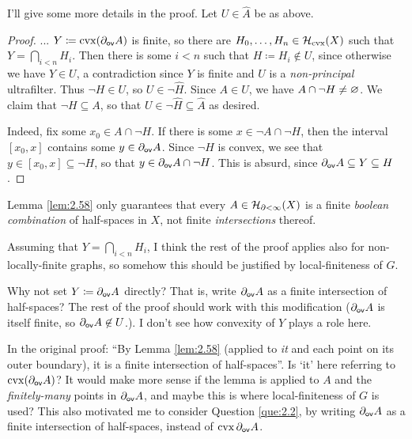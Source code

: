\documentclass{amsart}
\begin{document}
    I'll give some more details in the proof. Let $U\in\widehat{A}$ be as above.

    \begin{proof}
        ... $Y\coloneqq\cvx(\del_\sf{ov}A)$ is finite, so there are $H_0,\dots,H_n\in\mc{H}_\textrm{cvx}(X)$ such that $Y=\bigcap_{i<n}H_i$. Then there is some $i<n$ such that $H\coloneqq H_i\not\in U$, since otherwise we have $Y\in U$, a contradiction since $Y$ is finite and $U$ is a \textit{non-principal} ultrafilter. Thus $\lnot H\in U$, so $U\in\lnot\widehat{H}$. Since $A\in U$, we have $A\cap\lnot H\neq\em$. We claim that $\lnot H\subseteq A$, so that $U\in\lnot\widehat{H}\subseteq\widehat{A}$ as desired.

        Indeed, fix some $x_0\in A\cap\lnot H$. If there is some $x\in\lnot A\cap\lnot H$, then the interval $[x_0,x]$ contains some $y\in\del_\sf{ov}A$. Since $\lnot H$ is convex, we see that $y\in[x_0,x]\subseteq\lnot H$, so that $y\in\del_\sf{ov}A\cap\lnot H$. This is absurd, since $\del_\sf{ov}A\subseteq Y\subseteq H$.
    \end{proof}

    \begin{question}
        Lemma \ref{lem:2.58} only guarantees that every $A\in\mc{H}_{\del<\infty}(X)$ is a finite \textit{boolean combination} of half-spaces in $X$, not finite \textit{intersections} thereof.

        Assuming that $Y=\bigcap_{i<n}H_i$, I think the rest of the proof applies also for non-locally-finite graphs, so somehow this should be justified by local-finiteness of $G$.
    \end{question}

    \begin{question}\label{que:2.2}
        Why not set $Y\coloneqq\del_\sf{ov}A$ directly? That is, write $\del_\sf{ov}A$ as a finite intersection of half-spaces? The rest of the proof should work with this modification ($\del_\sf{ov}A$ is itself finite, so $\del_\sf{ov}A\not\in U$.). I don't see how convexity of $Y$ plays a role here.
    \end{question}

    \begin{question}
        In the original proof: ``By Lemma \ref{lem:2.58} (applied to \textit{it} and each point on its outer boundary), it is a finite intersection of half-spaces''. Is `it' here referring to $\cvx(\del_\sf{ov}A)$? It would make more sense if the lemma is applied to $A$ and the \textit{finitely-many} points in $\del_\sf{ov}A$, and maybe this is where local-finiteness of $G$ is used? This also motivated me to consider Question \ref{que:2.2}, by writing $\del_\sf{ov}A$ as a finite intersection of half-spaces, instead of $\cvx{\del_\sf{ov}A}$.
    \end{question}
\end{document}
